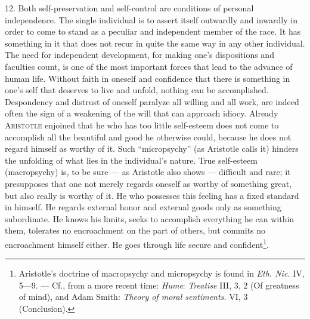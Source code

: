 \documentclass[12pt,a4paper,openany]{book}
\begin{document}
12. Both self-preservation and self-control are conditions of personal independence. The single individual is to
assert itself outwardly and inwardly in order to come to stand as a peculiar and independent member of the race. It
has something in it that does not recur in quite the same way in any other individual. The need for independent
development, for making one's dispositions and faculties count, is one of the most important forces that lead to the
advance of human life. Without faith in oneself and confidence that there is something in one's self that deserves
to live and unfold, nothing can be accomplished. Despondency and distrust of oneself paralyze all willing and all
work, are indeed often the sign of a weakening of the will that can approach idiocy. Already \textsc{Aristotle}
enjoined that he who has too little self-esteem does not come to accomplish all the beautiful and good he otherwise
could, because he does not regard himself as worthy of it. Such ``micropsychy'' (as Aristotle calls it) hinders the
unfolding of what lies in the individual's nature. True self-esteem (macropsychy) is, to be sure --- as Aristotle
also shows --- difficult and rare; it presupposes that one not merely regards oneself as worthy of something great,
but also really is worthy of it. He who possesses this feeling has a fixed standard in himself. He regards external
honor and external goods only as something subordinate. He knows his limits, seeks to accomplish everything he can
within them, tolerates no encroachment on the part of others, but commits no encroachment himself either. He goes
through life secure and confident\footnote[1]{Aristotle's doctrine of macropsychy and micropsychy is found in
\textit{Eth. Nic.} IV, 5---9. --- Cf., from a more recent time: \emph{Hume}: \textit{Treatise} III, 3, 2 (Of
greatness of mind), and Adam Smith: \textit{Theory of moral sentiments.} VI, 3 (Conclusion).}.
\end{document}
